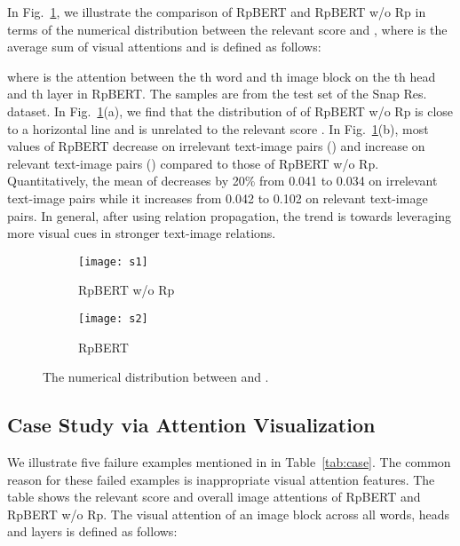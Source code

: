 \documentclass[letterpaper]{article} \usepackage{aaai21}  \usepackage{times}  \usepackage{helvet} \usepackage{courier}  \usepackage[hyphens]{url}  \usepackage{graphicx} \urlstyle{rm} \def\UrlFont{\rm}  \usepackage{natbib}  \usepackage{caption} \frenchspacing  \setlength{\pdfpagewidth}{8.5in}  \setlength{\pdfpageheight}{11in}
\begin{document}
In Fig.~\ref{fig:scorev}, we illustrate the comparison of RpBERT and RpBERT w/o Rp in terms of the numerical distribution between the relevant score  and , where  is the average sum of visual attentions and is defined as follows:

where  is the attention between the th word and th image block on the th head and th layer in RpBERT.
The samples are from the test set of the Snap Res. dataset.
In Fig.~\ref{fig:scorev}(a), we find that the distribution of  of RpBERT w/o Rp is close to a horizontal line and is unrelated to the relevant score .
In Fig.~\ref{fig:scorev}(b), most  values of RpBERT decrease on irrelevant text-image pairs () and increase on relevant text-image pairs () compared to those of RpBERT w/o Rp.
Quantitatively, the mean of    decreases by 20\% from 0.041 to 0.034 on irrelevant text-image pairs 
while it increases from 0.042 to  0.102 on relevant text-image pairs.
In general, after using relation propagation, the trend is towards leveraging more visual cues in stronger text-image relations.



\begin{figure}[tb]
\centering
\begin{subfigure}{0.23\textwidth}
	\centering
	\texttt{[image: s1]}
	\caption{RpBERT w/o Rp}
\end{subfigure}
\begin{subfigure}{0.23\textwidth}
	\centering
	\texttt{[image: s2]}
	\caption{RpBERT}
\end{subfigure}
\caption{The numerical distribution between  and .}
\label{fig:scorev}
\end{figure}











\subsection{Case Study via Attention Visualization}
We illustrate five failure examples mentioned in \cite{lu2018visual,arshad2019aiding,yu2020improving} in Table~\ref{tab:case}.
The common reason for these failed examples is inappropriate visual attention features.
The table shows the relevant score  and overall image attentions of RpBERT and RpBERT w/o Rp.
The visual attention of an image block  across all words, heads and layers is defined as follows:
\end{document}
